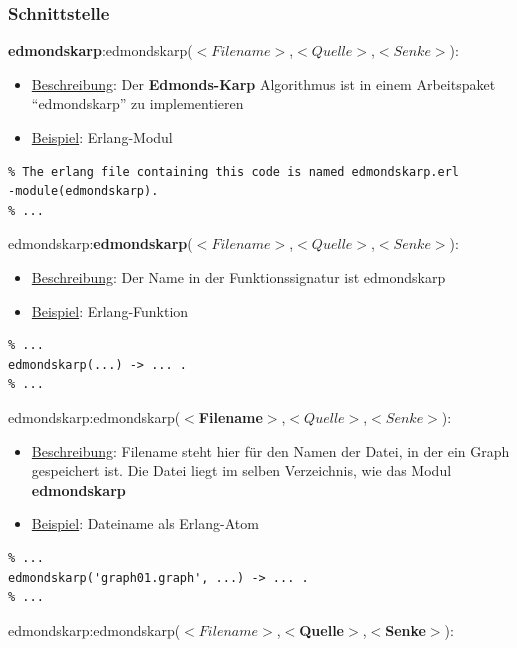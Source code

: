 \documentclass[11pt]{article}
\begin{document}
    \subsubsection{Schnittstelle}
    \textbf{edmondskarp}:edmondskarp($<Filename>$,$<Quelle>$,$<Senke>$):\\ 
    \begin{itemize}
        \item \underline{Beschreibung}: Der \textbf{Edmonds-Karp} Algorithmus ist in einem Arbeitspaket\\ "`edmondskarp"' zu implementieren
        \item \underline{Beispiel}: Erlang-Modul
    \end{itemize}
\begin{lstlisting}
% The erlang file containing this code is named edmondskarp.erl
-module(edmondskarp).
% ...
\end{lstlisting}
    edmondskarp:\textbf{edmondskarp}($<Filename>$,$<Quelle>$,$<Senke>$):\\ 
    \begin{itemize}
        \item \underline{Beschreibung}: Der Name in der Funktionssignatur ist edmondskarp
        \item \underline{Beispiel}: Erlang-Funktion
    \end{itemize}
\begin{lstlisting}
% ...
edmondskarp(...) -> ... .
% ...
\end{lstlisting}
    edmondskarp:edmondskarp($<$\textbf{Filename}$>$,$<Quelle>$,$<Senke>$):\\ 
    \begin{itemize}
        \item \underline{Beschreibung}: Filename steht hier f\"ur den Namen der Datei, in der ein Graph gespeichert ist. Die Datei liegt im selben Verzeichnis, wie das Modul \textbf{edmondskarp}
        \item \underline{Beispiel}: Dateiname als Erlang-Atom
    \end{itemize}
\begin{lstlisting}
% ...
edmondskarp('graph01.graph', ...) -> ... .
% ...
\end{lstlisting}
    edmondskarp:edmondskarp($<Filename>$,$<$\textbf{Quelle}$>$,$<$\textbf{Senke}$>$):\\ 
\end{document}
